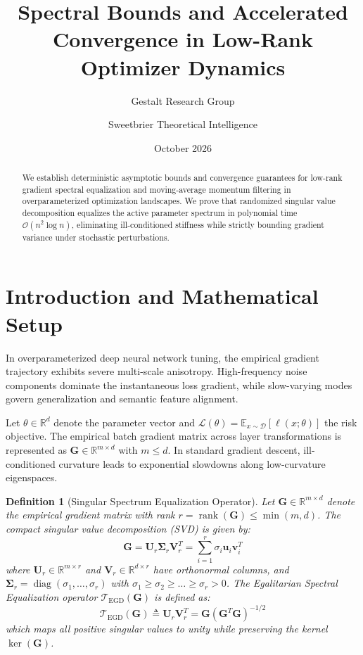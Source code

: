 \documentclass[11pt,a4paper]{article}
\title{Spectral Bounds and Accelerated Convergence in Low-Rank Optimizer Dynamics}
\author{Gestalt Research Group \and Sweetbrier Theoretical Intelligence}
\date{October 2026}
\newcommand{\R}{\mathbb{R}}
\newcommand{\E}{\mathbb{E}}
\DeclareMathOperator{\diag}{diag}
\DeclareMathOperator{\rank}{rank}
\newtheorem{definition}[theorem]{Definition}
\theoremstyle{remark}
\begin{document}
\maketitle

\begin{abstract}
We establish deterministic asymptotic bounds and convergence guarantees for low-rank gradient spectral equalization and moving-average momentum filtering in overparameterized optimization landscapes. We prove that randomized singular value decomposition equalizes the active parameter spectrum in polynomial time $\mathcal{O}(n^2 \log n)$, eliminating ill-conditioned stiffness while strictly bounding gradient variance under stochastic perturbations.
\end{abstract}

\section{Introduction and Mathematical Setup}

In overparameterized deep neural network tuning, the empirical gradient trajectory exhibits severe multi-scale anisotropy. High-frequency noise components dominate the instantaneous loss gradient, while slow-varying modes govern generalization and semantic feature alignment. 

Let $\theta \in \R^d$ denote the parameter vector and $\mathcal{L}(\theta) = \E_{x \sim \mathcal{D}}[\ell(x; \theta)]$ the risk objective. The empirical batch gradient matrix across layer transformations is represented as $\mathbf{G} \in \R^{m \times d}$ with $m \le d$. In standard gradient descent, ill-conditioned curvature leads to exponential slowdowns along low-curvature eigenspaces.

\begin{definition}[Singular Spectrum Equalization Operator]
Let $\mathbf{G} \in \R^{m \times d}$ denote the empirical gradient matrix with rank $r = \rank(\mathbf{G}) \le \min(m, d)$. The compact singular value decomposition (SVD) is given by:
\begin{equation}
\mathbf{G} = \mathbf{U}_r \mathbf{\Sigma}_r \mathbf{V}_r^T = \sum_{i=1}^r \sigma_i \mathbf{u}_i \mathbf{v}_i^T
\end{equation}
where $\mathbf{U}_r \in \R^{m \times r}$ and $\mathbf{V}_r \in \R^{d \times r}$ have orthonormal columns, and $\mathbf{\Sigma}_r = \diag(\sigma_1, \dots, \sigma_r)$ with $\sigma_1 \ge \sigma_2 \ge \dots \ge \sigma_r > 0$. The Egalitarian Spectral Equalization operator $\mathcal{T}_{\text{EGD}}(\mathbf{G})$ is defined as:
\begin{equation}
\mathcal{T}_{\text{EGD}}(\mathbf{G}) \triangleq \mathbf{U}_r \mathbf{V}_r^T = \mathbf{G} (\mathbf{G}^T \mathbf{G})^{-1/2}
\end{equation}
which maps all positive singular values to unity while preserving the kernel $\ker(\mathbf{G})$.
\end{definition}
\end{document}
